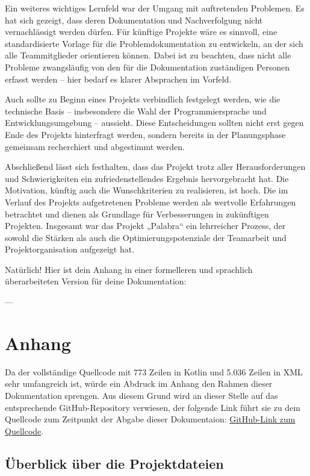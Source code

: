\documentclass[12pt,a4paper]{article}
\begin{document}
Ein weiteres wichtiges Lernfeld war der Umgang mit auftretenden Problemen. Es hat sich gezeigt, dass deren Dokumentation und Nachverfolgung nicht vernachlässigt werden dürfen. Für künftige Projekte wäre es sinnvoll, eine standardisierte Vorlage für die Problemdokumentation zu entwickeln, an der sich alle Teammitglieder orientieren können. Dabei ist zu beachten, dass nicht alle Probleme zwangsläufig von den für die Dokumentation zuständigen Personen erfasst werden – hier bedarf es klarer Absprachen im Vorfeld.

Auch sollte zu Beginn eines Projekts verbindlich festgelegt werden, wie die technische Basis – insbesondere die Wahl der Programmiersprache und Entwicklungsumgebung – aussieht. Diese Entscheidungen sollten nicht erst gegen Ende des Projekts hinterfragt werden, sondern bereits in der Planungsphase gemeinsam recherchiert und abgestimmt werden.

Abschließend lässt sich festhalten, dass das Projekt trotz aller Herausforderungen und Schwierigkeiten ein zufriedenstellendes Ergebnis hervorgebracht hat. Die Motivation, künftig auch die Wunschkriterien zu realisieren, ist hoch. Die im Verlauf des Projekts aufgetretenen Probleme werden als wertvolle Erfahrungen betrachtet und dienen als Grundlage für Verbesserungen in zukünftigen Projekten. Insgesamt war das Projekt „Palabra“ ein lehrreicher Prozess, der sowohl die Stärken als auch die Optimierungspotenziale der Teamarbeit und Projektorganisation aufgezeigt hat.

\appendix
Natürlich! Hier ist dein Anhang in einer formelleren und sprachlich überarbeiteten Version für deine Dokumentation:

---

\section{Anhang}

Da der vollständige Quellcode mit 773 Zeilen in Kotlin und 5.036 Zeilen in XML sehr umfangreich ist, würde ein Abdruck im Anhang den Rahmen dieser Dokumentation sprengen. Aus diesem Grund wird an dieser Stelle auf das entsprechende GitHub-Repository verwiesen, der folgende Link führt sie zu dem Quellcode zum Zeitpunkt der Abgabe dieser Dokumentaion:  
\href{https://github.com/Erik-Donath/Palabra/tree/cc55c524ebff2f6db85a36f6ec2c0afb23070e2f}{GitHub-Link zum Quellcode}.

\subsection*{Überblick über die Projektdateien}
\end{document}
